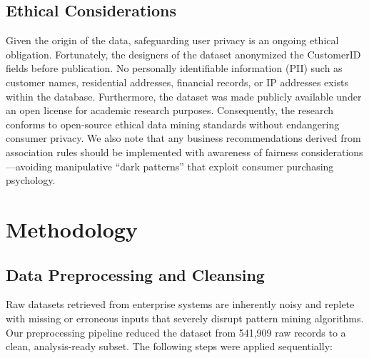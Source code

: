 \documentclass[conference]{IEEEtran}
\begin{document}
\subsection{Ethical Considerations}
Given the origin of the data, safeguarding user privacy is an ongoing ethical obligation. Fortunately, the designers of the dataset anonymized the CustomerID fields before publication. No personally identifiable information (PII) such as customer names, residential addresses, financial records, or IP addresses exists within the database. Furthermore, the dataset was made publicly available under an open license for academic research purposes. Consequently, the research conforms to open-source ethical data mining standards without endangering consumer privacy. We also note that any business recommendations derived from association rules should be implemented with awareness of fairness considerations---avoiding manipulative ``dark patterns'' that exploit consumer purchasing psychology.

\section{Methodology}

\subsection{Data Preprocessing and Cleansing}
Raw datasets retrieved from enterprise systems are inherently noisy and replete with missing or erroneous inputs that severely disrupt pattern mining algorithms. Our preprocessing pipeline reduced the dataset from 541,909 raw records to a clean, analysis-ready subset. The following steps were applied sequentially:
\end{document}
